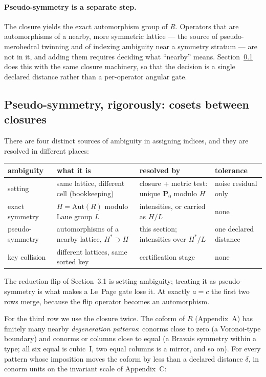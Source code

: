 \documentclass[11pt]{article}
\newcommand{\Pop}{\mathbf{P}}
\begin{document}
\paragraph{Pseudo-symmetry is a separate step.}
The closure yields the exact automorphism group of $R$. Operators that are automorphisms of a nearby, more symmetric lattice --- the source of pseudo-merohedral twinning and of indexing ambiguity near a symmetry stratum --- are not in it, and adding them requires deciding what ``nearby'' means. Section~\ref{sec:pseudo} does this with the same closure machinery, so that the decision is a single declared distance rather than a per-operator angular gate.

\subsection{Pseudo-symmetry, rigorously: cosets between closures}
\label{sec:pseudo}

There are four distinct sources of ambiguity in assigning indices, and they are resolved in different places:

\begin{center}\small
\begin{tabular}{p{2.4cm}p{4.2cm}p{4.6cm}p{2.2cm}}
\toprule
ambiguity & what it is & resolved by & tolerance \\
\midrule
setting & same lattice, different cell (bookkeeping) & closure + metric test: unique $\Pop_0$ modulo $H$ & noise residual only \\
exact symmetry & $H=\mathrm{Aut}(R)$ modulo Laue group $L$ & intensities, or carried as $H/L$ & none \\
pseudo-symmetry & automorphisms of a nearby lattice, $H^*\supset H$ & this section; intensities over $H^*/L$ & one declared distance \\
key collision & different lattices, same sorted key & certification stage & none \\
\bottomrule
\end{tabular}
\end{center}

The reduction flip of Section~3.1 is setting ambiguity; treating it as pseudo-symmetry is what makes a Le~Page gate lose it. At exactly $a=c$ the first two rows merge, because the flip operator becomes an automorphism.

For the third row we use the closure twice. The coform of $R$ (Appendix~A) has finitely many nearby \emph{degeneration patterns}: conorms close to zero (a Voronoi-type boundary) and conorms or columns close to equal (a Bravais symmetry within a type; all six equal is cubic~I, two equal columns is a mirror, and so on). For every pattern whose imposition moves the coform by less than a declared distance $\delta$, in conorm units on the invariant scale of Appendix~C:
\end{document}
